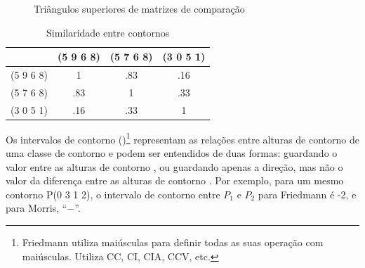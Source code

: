 \begin{figure}
  \qquad
  \qquad
  \caption{Triângulos superiores de matrizes de comparação}
  \label{fig:triangulos-com-matrix}
\end{figure}

\begin{table}
  \centering
    \begin{tabular}{c|ccc}
      & (5 9 6 8) & (5 7 6 8) & (3 0 5 1) \\
      \hline
      (5 9 6 8) & 1 & .83 & .16 \\
      (5 7 6 8) & .83 & 1 & .33 \\
      (3 0 5 1) & .16 & .33 & 1
    \end{tabular}
    \caption{Similaridade entre contornos}
  \label{tab:similaridade-contornos}
\end{table}

Os intervalos de contorno ()\footnote{Friedmann utiliza
  maiúsculas para definir todas as suas operação com
  maiúsculas. Utiliza CC, CI, CIA, CCV, etc.} representam as relações
entre alturas de contorno de uma classe de contorno e podem ser
entendidos de duas formas: guardando o valor entre as alturas de
contorno \cite{friedmann85:methodology}, ou guardando apenas a
direção, mas não o valor da diferença entre as alturas de contorno
\cite{morris93:directions}. Por exemplo, para um mesmo contorno P(0 3
1 2), o intervalo de contorno entre $P_1$ e $P_2$ para Friedmann é -2,
e para Morris, ``$-$''.

